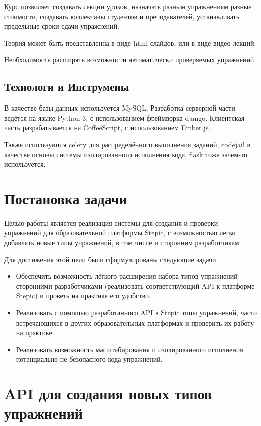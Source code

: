 \documentclass{matmex-diploma-custom}
\begin{document}
Курс позволяет создавать секции уроков, назначать разным упражнениям
разные стоимости, создавать коллективы студентов и преподавателей,
устанавливать предельные сроки сдачи упражнений.

Теория может быть представленна в виде html слайдов, или в виде видео
лекций.

Необходимость расширять возможности автоматически проверяемых упражнений.

\subsection{Технологи и Инструмены}
В качестве базы данных используется MySQL. Разработка серверной части
ведётся на языке Python 3, с использованием фреймворка
django. Клиентская часть разрабатывается на CoffeeScript, с
использованием Ember.js.

Также используются celery для распределённого выполнения заданий,
codejail в качестве основы системы изолированного исполнения кода,
flask тоже зачем-то используется.

\section{Постановка задачи}
Целью работы является реализация системы для создания и проверки
упражнений для образовательной платформы Stepic, с возможностью легко
добавлять новые типы упражнений, в том числе и сторонним
разработчикам.

Для достижения этой цели были сформулированы следующие задачи.

\begin{itemize}
\item Обеспечить возможность лёгкого расширения набора типов
  упражнений сторонними разработчиками (реализовать соответствующий API
  к платформе Stepic) и проветь на практике его удобство.
\item Реализовать с помощью разработанного API в Stepic типы
  упражнений, часто встречающихся в других образовательных платформах
  и проверить их работу на практике.
\item Реализовать возможность масштабирования и изолированного
  исполнения потенциально не безопасного кода упражнений.
\end{itemize}

\section{API для создания новых типов упражнений}
\end{document}
